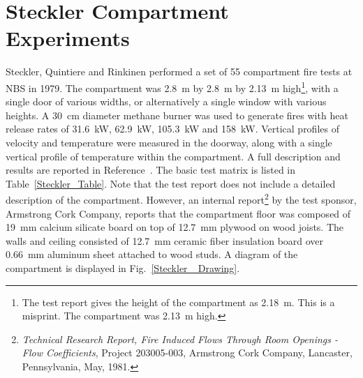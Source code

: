 \FloatBarrier

\section{Steckler Compartment Experiments}
\label{Steckler_Description}

Steckler, Quintiere and Rinkinen performed a set of 55 compartment fire tests at NBS in 1979. The compartment was 2.8~m by 2.8~m by 2.13~m high\footnote{The test report gives the height of the compartment as 2.18~m. This is a misprint. The compartment was 2.13~m high.}, with a single door of various widths, or alternatively a single window with various heights. A 30~cm diameter methane burner was used to generate fires with heat release rates of 31.6~kW, 62.9~kW, 105.3~kW and 158~kW. Vertical profiles of velocity and temperature were measured in the doorway, along with a single vertical profile of temperature within the compartment. A full description and results are reported in Reference~\cite{Steckler:NBSIR_82-2520}. The basic test matrix is listed in Table~\ref{Steckler_Table}. Note that the test report does not include a detailed description of the compartment. However, an internal report\footnote{ {\em Technical Research Report, Fire Induced Flows Through Room Openings - Flow Coefficients}, Project 203005-003, Armstrong Cork Company, Lancaster, Pennsylvania, May, 1981.} by the test sponsor, Armstrong Cork Company, reports that the compartment floor was composed of 19~mm calcium silicate board on top of 12.7~mm plywood on wood joists. The walls and ceiling consisted of 12.7~mm ceramic fiber insulation board over 0.66~mm aluminum sheet attached to wood studs. A diagram of the compartment is displayed in Fig.~\ref{Steckler_ Drawing}.

